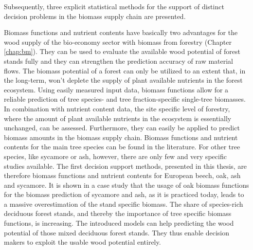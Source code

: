 Subsequently, three explicit statistical methods for the support of distinct decision problems in the biomass supply chain are presented.

Biomass functions and nutrient contents have basically two advantages for the wood supply of the bio-economy sector with biomass from forestry (Chapter \ref{chap:bm}). They can be used to evaluate the available wood potential of forest stands fully and they can strengthen the prediction accuracy of raw material flows. The biomass potential of a forest can only be utilized to an extent that, in the long-term, won't deplete the supply of plant available nutrients in the forest ecosystem. Using easily measured input data, biomass functions allow for a reliable prediction of tree species- and tree fraction-specific single-tree biomasses. In combination with nutrient content data, the site specific level of forestry, where the amount of plant available nutrients in the ecosystem is essentially unchanged, can be assessed. Furthermore, they can easily be applied to predict biomass amounts in the biomass supply chain. Biomass functions and nutrient contents for the main tree species can be found in the literature. For other tree species, like sycamore or ash, however, there are only few and very specific studies available. The first decision support methods, presented in this thesis, are therefore biomass functions and nutrient contents for European beech, oak, ash and sycamore. It is shown in a case study that the usage of oak biomass functions for the biomass prediction of sycamore and ash, as it is practiced today, leads to a massive overestimation of the stand specific biomass. The share of species-rich deciduous forest stands, and thereby the importance of tree specific biomass functions, is increasing. The introduced models can help predicting the wood potential of those mixed deciduous forest stands. They thus enable decision makers to exploit the usable wood potential entirely.

